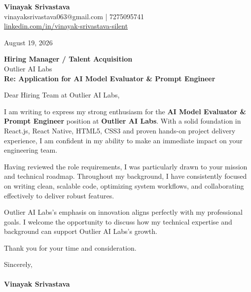 \documentclass[11pt,a4paper]{article}
\begin{document}
\thispagestyle{empty}

{\Large \textbf{Vinayak Srivastava}}\\
vinayaksrivastava063@gmail.com | 7275095741 \\
\url{linkedin.com/in/vinayak-srivastava-silent}

\vspace{1em}
\hfill August 19, 2026

\textbf{Hiring Manager / Talent Acquisition}\\
Outlier AI Labs\\

\vspace{1.5em}
\textbf{Re: Application for AI Model Evaluator & Prompt Engineer}

\vspace{1em}
Dear Hiring Team at Outlier AI Labs,

I am writing to express my strong enthusiasm for the \textbf{AI Model Evaluator & Prompt Engineer} position at \textbf{Outlier AI Labs}. With a solid foundation in React.js, React Native, HTML5, CSS3 and proven hands-on project delivery experience, I am confident in my ability to make an immediate impact on your engineering team.

Having reviewed the role requirements, I was particularly drawn to your mission and technical roadmap. Throughout my background, I have consistently focused on writing clean, scalable code, optimizing system workflows, and collaborating effectively to deliver robust features.

Outlier AI Labs's emphasis on innovation aligns perfectly with my professional goals. I welcome the opportunity to discuss how my technical expertise and background can support Outlier AI Labs's growth.

Thank you for your time and consideration.

\vspace{1.5em}
Sincerely,\\
\vspace{1em}\\
\textbf{Vinayak Srivastava}
\end{document}
